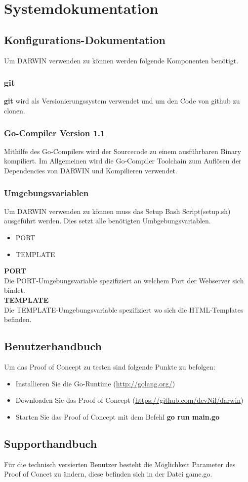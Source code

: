 \section{Systemdokumentation}
\subsection{Konfigurations-Dokumentation}
Um DARWIN verwenden zu können werden folgende Komponenten benötigt.
\subsubsection{git}
\textbf{git} wird als Versionierungssystem verwendet und um den 
Code von github zu clonen. 
\subsubsection{Go-Compiler Version 1.1}
Mithilfe des Go-Compilers wird der Sourcecode zu einem ausführbaren Binary
kompiliert. Im Allgemeinen wird die Go-Compiler Toolchain zum Auflösen 
der Dependencies von DARWIN und Kompilieren verwendet.
\subsubsection{Umgebungsvariablen}
Um DARWIN verwenden zu können muss das Setup Bash Script(setup.sh) ausgeführt werden.
Dies setzt alle benötigten Umbgebungsvariablen.
\begin{itemize}
    \item PORT
    \item TEMPLATE
\end{itemize}
\textbf{PORT}
\\
Die PORT-Umgebungsvariable spezifiziert an welchem  Port der Webserver sich
bindet.
\\
\textbf{TEMPLATE}
\\
Die TEMPLATE-Umgebungsvariable spezifiziert wo sich die HTML-Templates befinden. 
\subsection{Benutzerhandbuch}
Um das Proof of Concept zu testen sind folgende Punkte zu befolgen:\\
\begin{itemize}
    \item Installieren Sie die Go-Runtime (\url{http://golang.org/})
    \item Downloaden Sie das Proof of Concept (\url{https://github.com/devNil/darwin}) 
    \item Starten Sie das Proof of Concept mit dem Befehl \textbf{go run main.go}
\end{itemize}

\subsection{Supporthandbuch}
Für die technisch versierten Benutzer besteht die Möglichkeit Parameter des Proof of Concet zu ändern, diese befinden sich in der Datei game.go. \\
